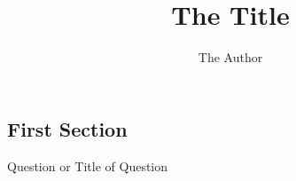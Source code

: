 \documentclass[
  english,
  ]{sdapsclassic}
\author{The Author}
\title{The Title}
\begin{document}
  \begin{questionnaire}
  \begin{Form}

    \section{First Section}


     
    \begin{choicegroup}{Question or Title of Question} 

    \end{choicegroup}


  \end{Form}
  \end{questionnaire}
\end{document}
